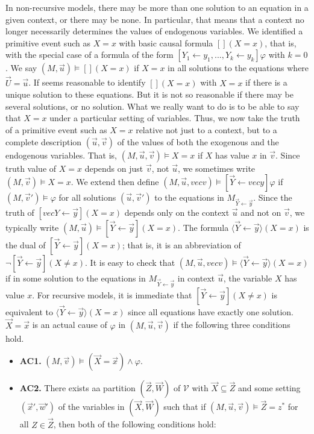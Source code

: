 \documentclass{article}
\begin{document}
\newcommand{\la}{\leftarrow}
\begin{definition}
    In non-recursive models, there may be more than one solution to
    an equation in a given context, or there may be none.
    In particular, that means that a context no longer necessarily 
    determines the values of endogenous variables.
    We identified a primitive event such as $X = x$ with basic causal formula $[](X=x)$, that is, with the special case of a formula
    of the form $[Y_1 \la y_1,...,Y_k\la y_k ]\varphi$ with $k =0 $.
    We say $(M,\vec u) \vDash [] (X = x)$ if $X=x$ in all solutions
    to the equations where $\vec U = \vec u$.
    If seems reasonable to identify $[](X=x)$ with $X=x$ if there
    is a unique solution to these equations.
    But it is not so reasonable if there may be several solutions,
    or no solution.
    What we really want to do is to be able to say that $X=x$ under
    a particular setting of variables.
    Thus, we now take the truth of a primitive event such as $X=x$
    relative not just to a context, but to a complete description
    $(\vec u, \vec v)$ of the values of both the exogenous and
    the endogenous variables.
    That is, $(M,\vec u,\vec v) \vDash X =x$ if $X$ has value $x$ in $\vec v$.
    Since truth value of $X=x$ depends on just $\vec v$, not $\vec u$,
    we sometimes write $(M,\vec v) \vDash X =x$.
    We extend then define $(M,\vec u, vec v) \vDash[\vec Y \la vec y]\varphi$ if $(M,\vec v') \vDash \varphi$ for all solutions 
    $(\vec u, \vec v')$ to the equations in $M_{\vec Y \la \vec y}$.
    Since the truth of $[vec Y \la \vec y](X=x)$ depends only on the
    context $\vec u$ and not on $\vec v$, we typically write $(M,\vec u) \vDash[ \vec Y \la \vec y](X=x)$.
    The formula $\langle \vec Y \la \vec y \rangle(X=x)$ is the dual
    of $[\vec Y \la \vec y](X=x)$; that is, it is an abbreviation of
    $\neg [\vec Y \la \vec y](X \neq x)$.
    It is easy to check that 
    $(M,\vec u, vec v) \vDash \langle \vec Y \la \vec y \rangle(X=x)$
    if in some solution to the equations in $M_{\vec Y \la \vec y}$ in
    context $\vec u$, the variable $X$ has value $x$.
    For recursive models, it is immediate that 
    $[\vec Y \la \vec y](X \neq x)$ is equivalent to
    $\langle \vec Y \la \vec y \rangle(X=x)$ since all equations
    have exactly one solution.
    $\vec X = \vec x$ is an actual cause of $\varphi$ in
    $(M,\vec u, \vec v) $ if the following three conditions hold.

    \begin{itemize}
        \item  \textbf{AC1.} $(M,\vec v)\models (\vec X = \vec x) \wedge \varphi$.
        \item  \textbf{AC2. }There exists aa partition $(\vec Z, \vec W)$ of $\mathcal{V}$ with $\vec X \subseteq \vec Z$ and some setting $(\vec x',\vec w')$ of the variables in $(\vec X,\vec W)$ such that if $(M,\vec u, \vec v)\models \vec Z = z^*$ for all $Z\in \vec Z$, then both of the following conditions hold:


\end{itemize}
\end{definition}
\end{document}

